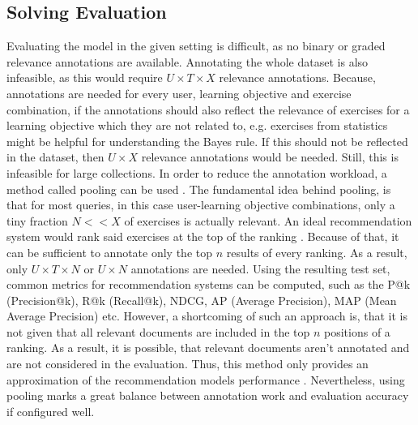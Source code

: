 \documentclass{Academic}
\begin{document}
        \FloatBarrier
        \subsection{Solving Evaluation}
        Evaluating the model in the given setting is difficult, as no binary or graded relevance annotations are available. Annotating the whole dataset is also infeasible, as this would require $U \times T \times X$ relevance annotations. Because, annotations are needed for every user, learning objective and exercise combination, if the annotations should also reflect the relevance of exercises for a learning objective which they are not related to, e.g. exercises from statistics might be helpful for understanding the Bayes rule. If this should not be reflected in the dataset, then $U \times X$ relevance annotations would be needed. Still, this is infeasible for large collections. In order to reduce the annotation workload, a method called pooling can be used \cite{suarezInformationRetrievalWeb2022}. The fundamental idea behind pooling, is that for most queries, in this case user-learning objective combinations, only a tiny fraction $N << X$ of exercises is actually relevant. An ideal recommendation system would rank said exercises at the top of the ranking \cite{suarezInformationRetrievalWeb2022}. Because of that, it can be sufficient to annotate only the top $n$ results of every ranking. As a result, only $U \times T \times N$ or $U \times N$ annotations are needed. Using the resulting test set, common metrics for recommendation systems can be computed, such as the P@k (Precision@k), R@k (Recall@k), NDCG, AP (Average Precision), MAP (Mean Average Precision) etc. However, a shortcoming of such an approach is, that it is not given that all relevant documents are included in the top $n$ positions of a ranking. As a result, it is possible, that relevant documents aren't annotated and are not considered in the evaluation. Thus, this method only provides an approximation of the recommendation models performance \cite{suarezInformationRetrievalWeb2022}. Nevertheless, using pooling marks a great balance between annotation work and evaluation accuracy if configured well.
         
\end{document}
